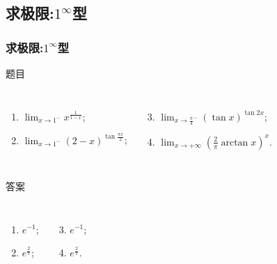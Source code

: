 \documentclass[
10pt,
aspectratio=43,
]{beamer}
\begin{document}
\subsection{求极限:$\displaystyle1^\infty$型}
\begin{frame}
	\frametitle{求极限:$\displaystyle1^\infty$型}
	\everymath{\displaystyle}
	\begin{block}{题目}
		\begin{columns}[onlytextwidth]
			\begin{enumerate}
				\item $\lim _{x \rightarrow1^-} x^{\frac{1}{1-x}}$;
				\item $\lim _{x \rightarrow1^-}(2-x)^{\tan \frac{\pi x}{2}}$;
			\end{enumerate}
			\begin{enumerate}
				\setcounter{enumi}{2}
				\item $\lim _{x \rightarrow \frac{\pi}{4}^-}(\tan x)^{\tan 2 x}$;
				\item $\lim _{x \rightarrow+\infty}\left(\frac{2}{\pi} \arctan x\right)^x$.
			\end{enumerate}
		\end{columns}
	\end{block}

	\begin{exampleblock}{答案}
		\begin{columns}[onlytextwidth]
			\begin{enumerate}
				\pause
				\item $e^{-1}$;
				\item $e^{\frac{2}{\pi}}$;
			\end{enumerate}
			\begin{enumerate}
				\setcounter{enumi}{2}
				\pause
				\item $e^{-1}$;
				\item $e^{\frac{2}{\pi}}$.
			\end{enumerate}
		\end{columns}
	\end{exampleblock}

\end{frame}
\end{document}
